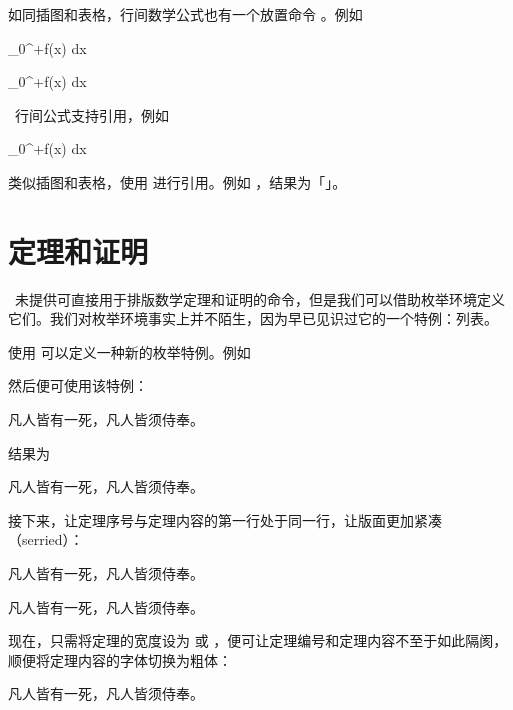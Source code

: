 如同插图和表格，行间数学公式也有一个放置命令 \type{\placeformula}。例如

\starttyping[option=TEX]
\placeformula
\startformula
\int_0^{+\infty}f(x) {\rm d}x
\stopformula
\stoptyping

\startformula
\int_0^{+\infty}f(x) {\rm d}x
\stopformula

\ConTeXt\ 行间公式支持引用，例如

\starttyping[option=TEX]
\startformula
\int_0^{+\infty}f(x) {\rm d}x
\stopformula
\stoptyping

\noindent 类似插图和表格，使用 \type{\in[...]} 进行引用。例如 ，结果为「」。

\section{定理和证明}

\ConTeXt\ 未提供可直接用于排版数学定理和证明的命令，但是我们可以借助枚举环境定义它们。我们对枚举环境事实上并不陌生，因为早已见识过它的一个特例：列表。

使用  可以定义一种新的枚举特例。例如

\starttyping[option=TEX]
\stoptyping

然后便可使用该特例：

\starttyping[option=TEX]
\starttheorem
凡人皆有一死，凡人皆须侍奉。
\stoptheorem
\stoptyping

\noindent 结果为

\startblueframedtext
{}
\starttheorem
凡人皆有一死，凡人皆须侍奉。
\stoptheorem
\stopblueframedtext

接下来，让定理序号与定理内容的第一行处于同一行，让版面更加紧凑（serried）：

\starttyping[option=TEX]
\starttheorem
凡人皆有一死，凡人皆须侍奉。
\stoptheorem
\stoptyping

\startblueframedtext
{}
\starttheorem
凡人皆有一死，凡人皆须侍奉。
\stoptheorem
\stopblueframedtext

现在，只需将定理的宽度设为  或 \type{\textwidth}，便可让定理编号和定理内容不至于如此隔阂，顺便将定理内容的字体切换为粗体：

\starttyping[option=TEX]
\starttheorem
凡人皆有一死，凡人皆须侍奉。
\stoptheorem
\stoptyping

